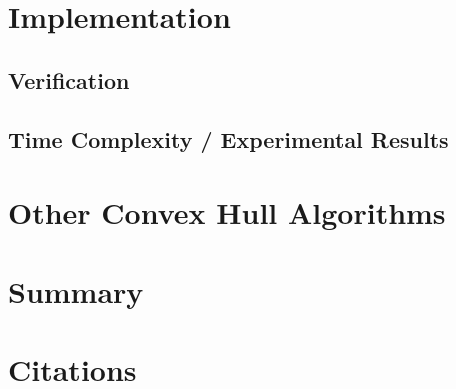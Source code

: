 \documentclass[11pt]{article}
\begin{document}
\section{Implementation}

\subsection{Verification}

\subsection{Time Complexity / Experimental Results}

\section{Other Convex Hull Algorithms}

\section{Summary}

\section{Citations}
\end{document}
